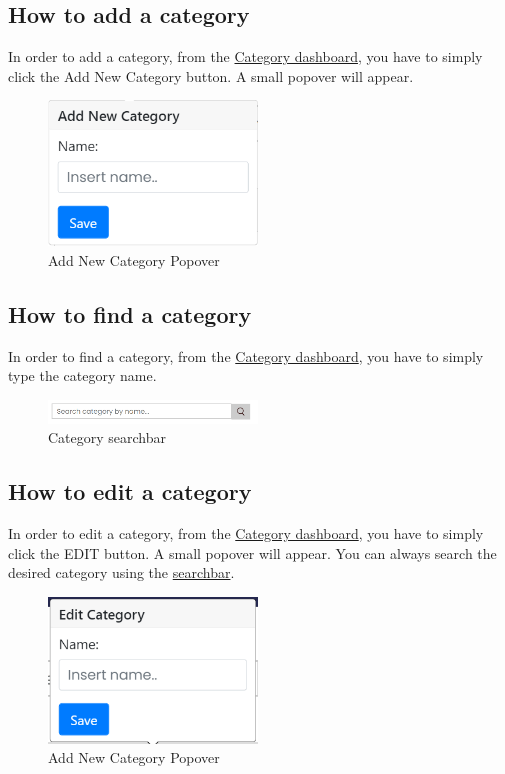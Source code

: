 \subsection{How to add a category}\label{_addCategory}
In order to add a category, from the \hyperref[_categorymanagement]{Category dashboard}, you have to simply click the Add New Category button.
A small popover will appear.
\begin{figure}[H]
    \centering
    \includegraphics[width=15em]{res/images/venditore/addcategorypopover.png}
    \caption{Add New Category Popover}
\end{figure}

\subsection{How to find a category}\label{_findCategory}
In order to find a category, from the \hyperref[_categorymanagement]{Category dashboard}, you have to simply type the category name.
\begin{figure}[H]
    \centering
    \includegraphics[width=15em]{res/images/venditore/categorysearchbar.png}
    \caption{Category searchbar}
\end{figure}

\subsection{How to edit a category}\label{_editCategory}
In order to edit a category, from the \hyperref[_categorymanagement]{Category dashboard}, you have to simply click the EDIT button.
A small popover will appear.
You can always search the desired category using the \hyperref[_findCategory]{searchbar}.
\begin{figure}[H]
    \centering
    \includegraphics[width=15em]{res/images/venditore/editcategorypopover.png}
    \caption{Add New Category Popover}
\end{figure}

